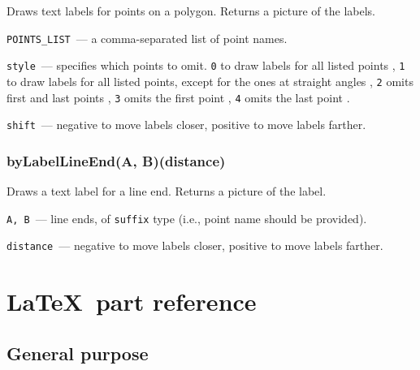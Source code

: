	Draws text labels for points on a polygon. Returns a picture of the labels.
	
	
	\texttt{POINTS\_LIST}~— a comma-separated list of point names.
	
	\texttt{style}~— specifies which points to omit. \texttt{0} to draw labels for all listed points
	, \texttt{1} to draw labels for all listed points, except for the ones at straight angles
	, \texttt{2} omits first and last points
	, \texttt{3} omits the first point
	, \texttt{4} omits the last point
	.
	
	\texttt{shift}~— negative to move labels closer, positive to move labels farther.

\subsubsection{byLabelLineEnd(A, B)(distance)}\label{byLabelLineEnd}
	
	Draws a text label for a line end. Returns a picture of the label.
	
	\texttt{A, B}~— line ends, of \texttt{suffix} type (i.e., point name should be provided).
	
	\texttt{distance}~— negative to move labels closer, positive to move labels farther.


\section{\LaTeX\ part reference}

\subsection{General purpose}

\sloppy


